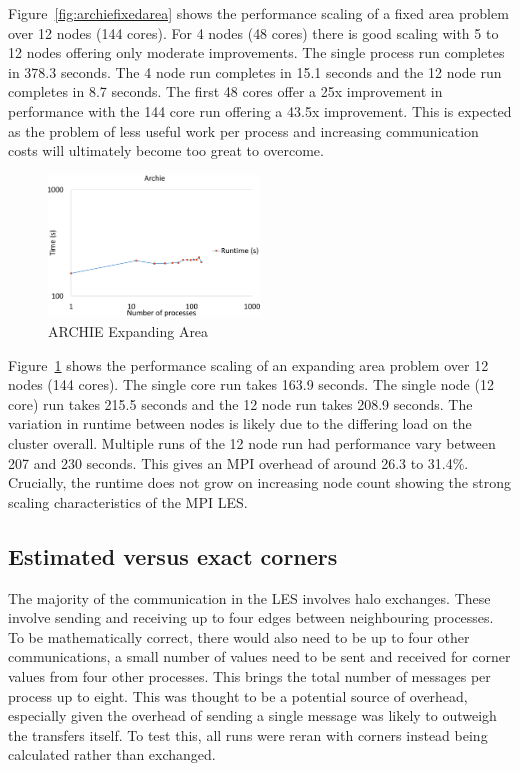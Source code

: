 Figure~\ref{fig:archiefixedarea} shows the performance scaling of a fixed area
problem over 12 nodes (144 cores). For 4 nodes (48 cores) there is good scaling
with 5 to 12 nodes offering only moderate improvements. The single process run
completes in 378.3 seconds. The 4 node run completes in 15.1 seconds and the 12
node run completes in 8.7 seconds. The first 48 cores offer a 25x improvement in
performance with the 144 core run offering a 43.5x improvement. This is expected
as the problem of less useful work per process and increasing communication
costs will ultimately become too great to overcome.

\begin{figure}
    \includegraphics[page=1,width=0.5\textwidth]
    {graphs/ARCHIE-OpenMPI162-GFORTRAN482-default-mapping-expanding-area-crop.pdf}
    \caption{ARCHIE Expanding Area}
    \label{fig:archieexpandingarea}
\end{figure}

Figure~\ref{fig:archieexpandingarea} shows the performance scaling of an
expanding area problem over 12 nodes (144 cores). The single core run takes
163.9 seconds. The single node (12 core) run takes 215.5 seconds and the 12 node
run takes 208.9 seconds. The variation in runtime between nodes is likely due to
the differing load on the cluster overall. Multiple runs of the 12 node run had
performance vary between 207 and 230 seconds. This gives an MPI overhead of
around 26.3 to 31.4\%. Crucially, the runtime does not grow on increasing node
count showing the strong scaling characteristics of the MPI LES.

\subsection{Estimated versus exact corners}

The majority of the communication in the LES involves halo exchanges. These
involve sending and receiving up to four edges between neighbouring processes.
To be mathematically correct, there would also need to be up to four other
communications, a small number of values need to be sent and received for corner
values from four other processes. This brings the total number of messages per
process up to eight. This was thought to be a potential source of overhead,
especially given the overhead of sending a single message was likely to outweigh
the transfers itself. To test this, all runs were reran with corners instead
being calculated rather than exchanged.

